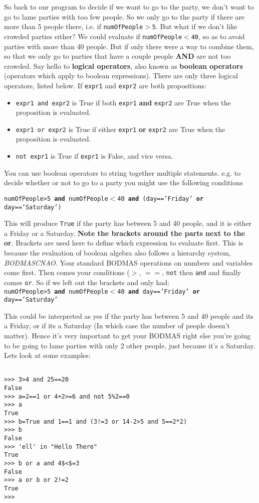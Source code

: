 So back to our program to decide if we want to go to the party, we don't want to go to lame parties with too few people. So we only go to the party if there are more than 5 people there, i.e. if 
\texttt{numOfPeople$>$5}. But what if we don't like crowded parties either? We could evaluate if 
\texttt{numOfPeople$<$40}, so as to avoid parties with more than 40 people. But if only there were a way to combine them, so that we only go to parties that have a couple people \textbf{AND} are not too crowded. Say hello to \textbf{logical operators}, also known   as \textbf{boolean operators} (operators which apply to boolean expressions). There   are only three logical operators, listed below. If \texttt{expr1} and \texttt{expr2}   are both propositions:
\begin{itemize}
	\item 
\texttt{expr1 and expr2} is True if both \texttt{expr1}    \textbf{and} \texttt{expr2} are True when the proposition is    evaluated.
	\item 
\texttt{expr1 or expr2} is True if either \texttt{expr1}    \textbf{or} \texttt{expr2} are True when the proposition is    evaluated.
	\item 
\texttt{not expr1} is True if \texttt{expr1} is False, and vice    versa.
\end{itemize}

 You can use boolean operators to string together multiple statements. e.g. to decide whether or not to go to a party you might use the following conditions


\texttt{numOfPeople>5 {\bfseries and} numOfPeople$<$40 \textbf{and} (day=='Friday' \textbf{or} day=='Saturday')}

 This will produce \texttt{True} if the party has between 5 and 40 people, and it is either a Friday or a Saturday. \textbf{Note the brackets around the parts next to the or}. Brackets are used here to define which expression to evaluate first. This is because the evaluation of boolean algebra also follows a hierarchy system, \textit{BODMASCNAO}. Your standard BODMAS operations on numbers and variables come first. Then comes your conditions ($>$, $==$, \texttt{not} then \texttt{and} and finally comes \texttt{or}. So if we left out the brackets and only had: \\
\texttt{numOfPeople>5 \textbf{and} numOfPeople$<$40 \textbf{and} day=='Friday' \textbf{or} day=='Saturday'}

 This could be interpreted as yes if the party has between 5 and 40 people and its a Friday, or if its a Saturday (In which case the number of people doesn't matter). Hence it's very important to get your BODMAS right else you're going to be going to lame parties with only 2 other people, just because it's a Saturday. Lets look at some examples:
\begin{lstlisting}
	
>>> 3>4 and 25==20
False
>>> a=2==1 or 4+2>=6 and not 5%2==0
>>> a
True
>>> b=True and 1==1 and (3!=3 or 14-2>5 and 5==2*2)
>>> b
False
>>> 'ell' in "Hello There"
True
>>> b or a and 4$<$=3
False
>>> a or b or 2!=2
True
>>>
		\end{lstlisting}

